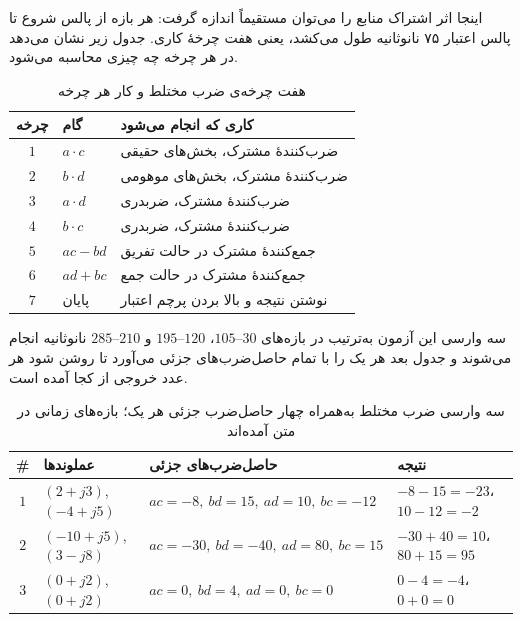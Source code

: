 \documentclass[12pt,a4paper]{article}
\begin{document}
	اینجا اثر اشتراک منابع را می‌توان مستقیماً اندازه گرفت: هر بازه از پالس شروع تا پالس اعتبار ۷۵ نانوثانیه طول می‌کشد، یعنی هفت چرخهٔ کاری. جدول زیر نشان می‌دهد در هر چرخه چه چیزی محاسبه می‌شود.

	\begin{table}[H]
		\centering
		\footnotesize
		\begin{tabular}{|c|l|l|}
			\hline
			\textbf{چرخه} & \textbf{گام} & \textbf{کاری که انجام می‌شود} \\ \hline
			\(1\) & \(a\cdot c\) & ضرب‌کنندهٔ مشترک، بخش‌های حقیقی \\ \hline
			\(2\) & \(b\cdot d\) & ضرب‌کنندهٔ مشترک، بخش‌های موهومی \\ \hline
			\(3\) & \(a\cdot d\) & ضرب‌کنندهٔ مشترک، ضربدری \\ \hline
			\(4\) & \(b\cdot c\) & ضرب‌کنندهٔ مشترک، ضربدری \\ \hline
			\(5\) & \(ac-bd\) & جمع‌کنندهٔ مشترک در حالت تفریق \\ \hline
			\(6\) & \(ad+bc\) & جمع‌کنندهٔ مشترک در حالت جمع \\ \hline
			\(7\) & پایان & نوشتن نتیجه و بالا بردن پرچم اعتبار \\ \hline
		\end{tabular}
		\caption{هفت چرخه‌ی ضرب مختلط و کار هر چرخه}
	\end{table}

	سه وارسی این آزمون به‌ترتیب در بازه‌های \(30\)--\(105\)، \(120\)--\(195\) و \(210\)--\(285\) نانوثانیه انجام می‌شوند و جدول بعد هر یک را با تمام حاصل‌ضرب‌های جزئی می‌آورد تا روشن شود هر عدد خروجی از کجا آمده است.

	\begin{table}[H]
		\centering
		\footnotesize
		\begin{tabular}{|c|l|l|l|}
			\hline
			\textbf{\#} & \textbf{عملوندها} & \textbf{حاصل‌ضرب‌های جزئی} & \textbf{نتیجه} \\ \hline
			\(1\) & \((2+j3)\), \((-4+j5)\)  & \(ac=-8,\ bd=15,\ ad=10,\ bc=-12\)  & \(-8-15=-23\)، \(10-12=-2\) \\ \hline
			\(2\) & \((-10+j5)\), \((3-j8)\) & \(ac=-30,\ bd=-40,\ ad=80,\ bc=15\) & \(-30+40=10\)، \(80+15=95\) \\ \hline
			\(3\) & \((0+j2)\), \((0+j2)\)   & \(ac=0,\ bd=4,\ ad=0,\ bc=0\)       & \(0-4=-4\)، \(0+0=0\) \\ \hline
		\end{tabular}
		\caption{سه وارسی ضرب مختلط به‌همراه چهار حاصل‌ضرب جزئی هر یک؛ بازه‌های زمانی در متن آمده‌اند}
	\end{table}
\end{document}
